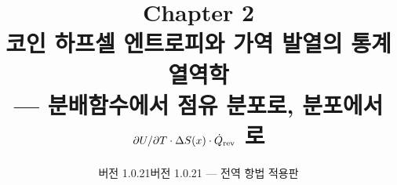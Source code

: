 

\title{\textbf{\LARGE Chapter 2}\\[0.35em]\Large 코인 하프셀 엔트로피와 가역 발열의 통계열역학\\[0.2em]\large — 분배함수에서 점유 분포로, 분포에서 $\partial U/\partial T\cdot\Delta S(x)\cdot\dot Q_{\mathrm{rev}}$ 로}
\author{}
\date{\normalsize 버전 1.0.21}
\ifnavaid\date{\normalsize 버전 1.0.21 --- 전역 항법 적용판}\fi


\maketitle
















